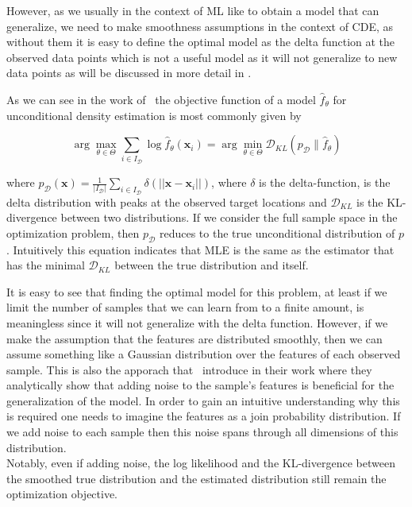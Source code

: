 However, as we usually in the context of ML like to obtain a model that can generalize, we need to make smoothness assumptions in the context of CDE, as without them it is easy to define the optimal model as the delta function at the observed data points which is not a useful model as it will not generalize to new data points as will be discussed in more detail in .

As we can see in the work of~\cite{rothfuss2019noise} the objective function of a model $\hat{f}_\theta$ for unconditional density estimation is most commonly given by

\begin{equation}
    \arg \max _{\theta \in \Theta} \sum_{i\in I_{\mathcal{D}}} \log
    \hat{f}_\theta\left(\mathbf{x}_i\right)=\arg \min _{\theta \in \Theta}
    \mathcal{D}_{KL}\left(p_{\mathcal{D}} \| \hat{f}_\theta\right)
    \label{eq:kl_divergence_mll}
\end{equation}

where $p_{\mathcal{D}}(\mathbf{x})=\frac{1}{|I_{\mathcal{D}}|} \sum_{i \in I_{\mathcal{D}}} \delta (||\mathbf{x} - \mathbf{x}_i||)$, where $\delta$ is the delta-function, is the delta distribution with peaks at the observed target locations and $\mathcal{D}_{K
L}$ is the KL-divergence between two distributions. If we consider the full sample space in the optimization problem, then $p_{\mathcal{D}}$ reduces to the true unconditional distribution of $p$. Intuitively this equation indicates that MLE is the same as the estimator that has the minimal $\mathcal{D}_{KL}$ between the true distribution and itself.

It is easy to see that finding the optimal model for this problem, at least if we limit the number of samples that we can learn from to a finite amount, is meaningless since it will not generalize with the delta function. However, if we make the assumption that the features are distributed smoothly, then we can assume something like a Gaussian distribution over the features of each observed sample. This is also the apporach that~\cite{rothfuss2019noise} introduce in their work where they analytically show that adding noise to the sample's features is beneficial for the generalization of the model. In order to gain an intuitive understanding why this is required one needs to imagine the features as a join probability distribution. If we add noise to each sample then this noise spans through all dimensions of this distribution.\\
Notably, even if adding noise, the log likelihood and the KL-divergence between the smoothed true distribution and the estimated distribution still remain the optimization objective.

